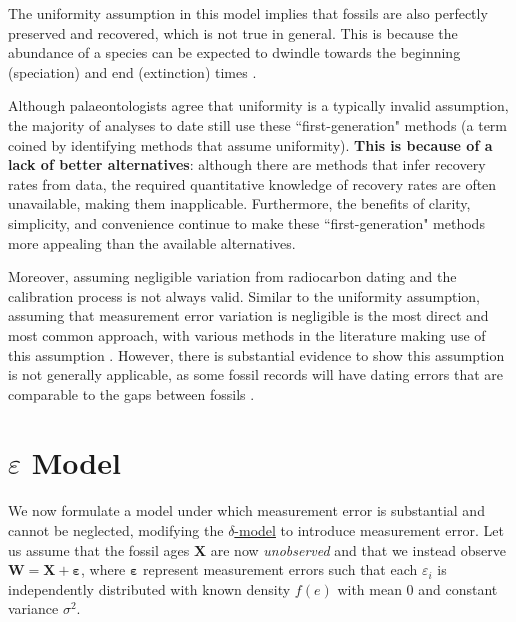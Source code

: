 The uniformity assumption in this model implies that fossils are also perfectly preserved and recovered, which is not true in general. This is because the abundance of a species can be expected to dwindle towards the beginning (speciation) and end (extinction) times \cite{Lee2010, WangMarshall2016}.

Although palaeontologists agree that uniformity is a typically invalid assumption, the majority of analyses to date still use these ``first-generation" methods (a term coined by \citet{WangMarshall2016} identifying methods that assume uniformity). \textbf{This is because of a lack of better alternatives}: although there are methods that infer recovery rates from data, the required quantitative knowledge of recovery rates are often unavailable, making them inapplicable. Furthermore, the benefits of clarity, simplicity, and convenience continue to make these ``first-generation" methods more appealing than the available alternatives.

Moreover, assuming negligible variation from radiocarbon dating and the calibration process is not always valid. Similar to the uniformity assumption, assuming that measurement error variation is negligible is the most direct and most common approach, with various methods in the literature making use of this assumption \cite{Mcinerny2006, Solow1993, Strauss1989, Wang2016, Weiss1999}. However, there is substantial evidence to show this assumption is not generally applicable, as some fossil records will have dating errors that are comparable to the gaps between fossils \cite{Solow2006}.

\clearpage

\section{$\varepsilon$ Model}\label{section: varepsilon-model}

We now formulate a model under which measurement error is substantial and cannot be neglected, modifying the \hyperref[model: no-measurement-error]{$\delta$-model} to introduce measurement error. Let us assume that the fossil ages $\bm{X}$ are now \textit{unobserved} and that we instead observe $\bm{W} = \bm{X} + \bm{\varepsilon}$, where $\bm{\varepsilon}$ represent measurement errors such that each $\varepsilon_i$ is independently distributed with known density $f(e)$ with mean 0 and constant variance $\sigma^2$.

